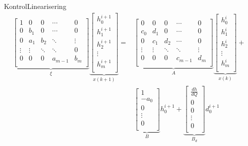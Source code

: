 \begin{frame}{Kontrol}{Linearisering}
 \begin{equation}
\begin{aligned}
	   \underbrace{\begin{bmatrix}
	    	1 & 0    & 0    &\cdots &0\\
	    	0 & b_1  & 0    &\cdots &0\\
	    	0 &a_{1} & b_2  &\ddots &\vdots	  \\
	    \vdots&\vdots&\ddots&\ddots & 0  \\
	        0 & 0    &0  	&a_{m-1}&  b_m\\
	   \end{bmatrix}}_{\xi}
	    \underbrace{\begin{bmatrix}
		h_{0}^{i+1}\\
		h_{1}^{i+1} \\
		h_{2}^{i+1} \\			
		\vdots		\\
		h_{m}^{i+1}\\
	\end{bmatrix}}_{x(k+1)}
	=& 
	\underbrace{\begin{bmatrix}
	    	0 &  0   &   0    & \cdots   &0\\
	    c_{0} & d_1  &   0    &  \cdots  &0\\
	    0	  &c_{1} & d_2    & \cdots   &0 \\
	    \vdots&\vdots&\ddots  & \ddots   & \vdots\\
	    0	  & 0    &  0     &  c_{m-1} &  d_m\\
	    \end{bmatrix}}_{A}
	    	\underbrace{\begin{bmatrix}
		h_{0}^{i} \\
		h_{1}^{i} \\
		h_{2}^{i}\\
		\vdots		\\
		h_{m}^{i}\\
		\end{bmatrix}}_{x(k)}
	+ \\ & \underbrace{\begin{bmatrix}
		 1\\
		 -a_0 \\
		 0\\
		 \vdots \\
		 0\\
		\end{bmatrix}}_{B}
		h_0^{i+1}
		+ 
		\underbrace{\begin{bmatrix}
		 \frac{dh}{dQ}\\
		 0 \\
		 0\\
		 \vdots \\
		 0\\
		\end{bmatrix}}_{B_d}
		d_{0}^{i+1}
	\end{aligned}
\end{equation}   



\end{frame}
